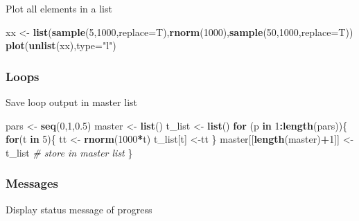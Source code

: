 \documentclass[10,portrait]{article}
\newenvironment{Shaded}{\begin{snugshade}}{\end{snugshade}}
\newcommand{\KeywordTok}[1]{\textcolor[rgb]{0.13,0.29,0.53}{\textbf{#1}}}
\newcommand{\DataTypeTok}[1]{\textcolor[rgb]{0.13,0.29,0.53}{#1}}
\newcommand{\DecValTok}[1]{\textcolor[rgb]{0.00,0.00,0.81}{#1}}
\newcommand{\FloatTok}[1]{\textcolor[rgb]{0.00,0.00,0.81}{#1}}
\newcommand{\StringTok}[1]{\textcolor[rgb]{0.31,0.60,0.02}{#1}}
\newcommand{\CommentTok}[1]{\textcolor[rgb]{0.56,0.35,0.01}{\textit{#1}}}
\newcommand{\ControlFlowTok}[1]{\textcolor[rgb]{0.13,0.29,0.53}{\textbf{#1}}}
\newcommand{\OperatorTok}[1]{\textcolor[rgb]{0.81,0.36,0.00}{\textbf{#1}}}
\newcommand{\NormalTok}[1]{#1}
\begin{document}
Plot all elements in a list

\begin{Shaded}
\begin{Highlighting}[]
\NormalTok{xx <-}\StringTok{ }\KeywordTok{list}\NormalTok{(}\KeywordTok{sample}\NormalTok{(}\DecValTok{5}\NormalTok{,}\DecValTok{1000}\NormalTok{,}\DataTypeTok{replace=}\NormalTok{T),}\KeywordTok{rnorm}\NormalTok{(}\DecValTok{1000}\NormalTok{),}\KeywordTok{sample}\NormalTok{(}\DecValTok{50}\NormalTok{,}\DecValTok{1000}\NormalTok{,}\DataTypeTok{replace=}\NormalTok{T))}
\KeywordTok{plot}\NormalTok{(}\KeywordTok{unlist}\NormalTok{(xx),}\DataTypeTok{type=}\StringTok{"l"}\NormalTok{)}
\end{Highlighting}
\end{Shaded}

\subsubsection{Loops}\label{loops}

Save loop output in master list

\begin{Shaded}
\begin{Highlighting}[]
\NormalTok{pars <-}\StringTok{ }\KeywordTok{seq}\NormalTok{(}\DecValTok{0}\NormalTok{,}\DecValTok{1}\NormalTok{,}\FloatTok{0.5}\NormalTok{)}
\NormalTok{master <-}\StringTok{ }\KeywordTok{list}\NormalTok{()}
\NormalTok{t_list <-}\StringTok{ }\KeywordTok{list}\NormalTok{()}
\ControlFlowTok{for}\NormalTok{ (p }\ControlFlowTok{in} \DecValTok{1}\OperatorTok{:}\KeywordTok{length}\NormalTok{(pars))\{}
  \ControlFlowTok{for}\NormalTok{(t }\ControlFlowTok{in} \DecValTok{5}\NormalTok{)\{}
\NormalTok{    tt <-}\StringTok{ }\KeywordTok{rnorm}\NormalTok{(}\DecValTok{1000}\OperatorTok{*}\NormalTok{t)}
\NormalTok{    t_list[t] <-tt }
\NormalTok{  \}}
\NormalTok{  master[[}\KeywordTok{length}\NormalTok{(master)}\OperatorTok{+}\DecValTok{1}\NormalTok{]] <-}\StringTok{ }\NormalTok{t_list }\CommentTok{# store in master list}
\NormalTok{\} }
\end{Highlighting}
\end{Shaded}

\subsubsection{Messages}\label{messages}

Display status message of progress
\end{document}
